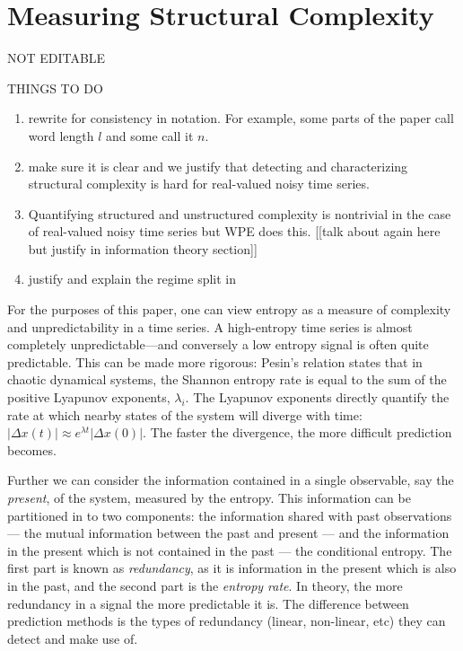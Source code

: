 \section{Measuring Structural Complexity }\label{sec:meaComplex}
{\color{red} NOT EDITABLE}

THINGS TO DO
\begin{enumerate}
\item rewrite for consistency in notation. For example, some parts of the paper call word length $l$ and some call it $n$.

\item make sure it is clear and we justify that detecting and characterizing structural complexity is hard for real-valued noisy time series.
\item Quantifying structured and unstructured complexity is nontrivial in the case of real-valued noisy time series but WPE does this. [[talk about again here but justify in information theory section]]
\item justify and explain the regime split in 
\end{enumerate}


For the purposes of this paper, one can view entropy as a measure of complexity and unpredictability in a time series.  A high-entropy time series is almost completely unpredictable---and conversely a low entropy signal is often quite predictable.  This can be made more rigorous: Pesin's relation \cite{pesin77} states that in chaotic dynamical systems, the Shannon entropy rate is equal to the sum of the positive Lyapunov exponents, $\lambda_i$. The Lyapunov exponents directly quantify the rate at which nearby states of the system will diverge with time: $\left| \Delta x(t) \right| \approx e^{\lambda t} \left| \Delta x(0) \right|$.  The faster the divergence, the more difficult prediction becomes.

Further we can consider the information contained in a single observable, say the \emph{present}, of the system, measured by the entropy. This information can be partitioned in to two components: the information shared with past observations --- the mutual information between the past and present --- and the information in the present which is not contained in the past --- the conditional entropy. The first part is known as \emph{redundancy}, as it is information in the present which is also in the past, and the second part is the \emph{entropy rate}. In theory, the more redundancy in a signal the more predictable it is. The difference between prediction methods is the types of redundancy (linear, non-linear, etc) they can detect and make use of.

